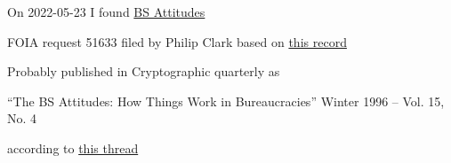 
On 2022-05-23 I found 
\href{https://www.nsa.gov/portals/75/documents/news-features/declassified-documents/cryptologic-quarterly/bs_attitudes.pdf}{BS Attitudes}

FOIA request 51633 filed by Philip Clark based on \href{https://www.archives.gov/files/foia/tracking/special-access-foia-logs-2016-2017.pdf}{this record}

Probably published in Cryptographic quarterly as

``The BS Attitudes: How Things Work in Bureaucracies''
Winter 1996 – Vol. 15, No. 4

according to \href{https://www.schneier.com/blog/archives/2011/03/recently_declas.html}{this thread}